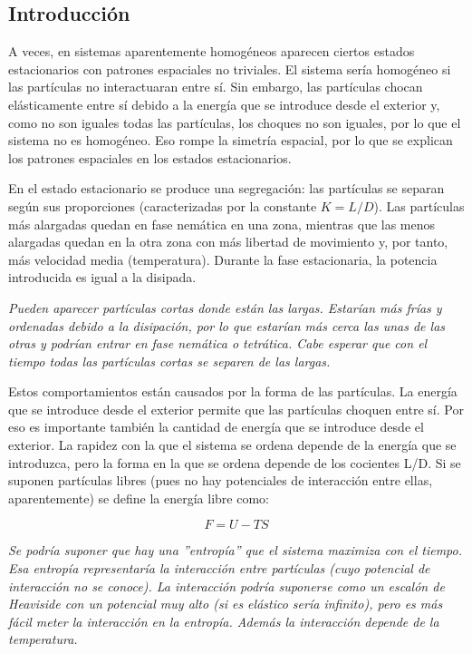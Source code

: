 \documentclass[twoside]{article}
\begin{document}
\begin{multicols}{2} %

\section*{Introducci\'on}

A veces, en sistemas aparentemente homog\'eneos aparecen ciertos estados estacionarios con patrones espaciales no triviales. El sistema ser\'ia homog\'eneo si las part\'iculas no interactuaran entre s\'i. Sin embargo, las part\'iculas chocan el\'asticamente entre s\'i debido a la energ\'ia que se introduce desde el exterior y, como no son iguales todas las part\'iculas, los choques no son iguales, por lo que el sistema no es homog\'eneo. Eso rompe la simetr\'ia espacial, por lo que se explican los patrones espaciales en los estados estacionarios.

En el estado estacionario se produce una segregaci\'on: las part\'iculas se separan seg\'un sus proporciones (caracterizadas por la constante $K=L/D$). Las part\'iculas m\'as alargadas quedan en fase nem\'atica en una zona, mientras que las menos alargadas quedan en la otra zona con m\'as libertad de movimiento y, por tanto, m\'as velocidad media (temperatura). Durante la fase estacionaria, la potencia introducida es igual a la disipada.

\emph{Pueden aparecer part\'iculas cortas donde est\'an las largas. Estar\'ian m\'as fr\'ias y ordenadas debido a la disipaci\'on, por lo que estar\'ian m\'as cerca las unas de las otras y podr\'ian entrar en fase nem\'atica o tetr\'atica. Cabe esperar que con el tiempo todas las part\'iculas cortas se separen de las largas.}

Estos comportamientos est\'an causados por la forma de las part\'iculas. La energ\'ia que se introduce desde el exterior permite que las part\'iculas choquen entre s\'i. Por eso es importante tambi\'en la cantidad de energ\'ia que se introduce desde el exterior. La rapidez con la que el sistema se ordena depende de la energ\'ia que se introduzca, pero la forma en la que se ordena depende de los cocientes L/D. Si se suponen part\'iculas libres (pues no hay potenciales de interacci\'on entre ellas, aparentemente) se  define la energ\'ia libre como:

\begin{equation}
F = U - TS
\end{equation}

\emph{Se podr\'ia suponer que hay una ''entrop\'ia'' que el sistema maximiza con el tiempo. Esa entrop\'ia representar\'ia la interacci\'on entre part\'iculas (cuyo potencial de interacci\'on no se conoce). La interacci\'on podr\'ia suponerse como un escal\'on de Heaviside con un potencial muy alto (si es el\'astico ser\'ia infinito), pero es m\'as f\'acil meter la interacci\'on en la entrop\'ia. Adem\'as la interacci\'on depende de la temperatura.}


\end{multicols}
\end{document}
